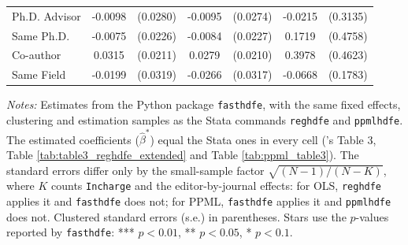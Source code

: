 \begin{table}[!htbp]
\begin{tabular*}{\linewidth}{@{\extracolsep{\fill}}lcccccc}
\quad Ph.D. Advisor & -0.0098 & (0.0280) & -0.0095 & (0.0274) & -0.0215 & (0.3135) \\
\quad Same Ph.D. & -0.0075 & (0.0226) & -0.0084 & (0.0227) & 0.1719 & (0.4758) \\
\quad Co-author & 0.0315 & (0.0211) & 0.0279 & (0.0210) & 0.3978 & (0.4623) \\
\quad Same Field & -0.0199 & (0.0319) & -0.0266 & (0.0317) & -0.0668 & (0.1783) \\
\bottomrule
\end{tabular*}
\begin{minipage}{\linewidth}
\vspace{4pt}
\footnotesize\textit{Notes:} Estimates from the Python package \texttt{fasthdfe}, with the same fixed effects, clustering and estimation samples as the Stata commands \texttt{reghdfe} and \texttt{ppmlhdfe}. The estimated coefficients ($\widehat{\beta}^\ast$) equal the Stata ones in every cell (\citeauthor{Colussi2018}'s Table 3, Table \ref{tab:table3_reghdfe_extended} and Table \ref{tab:ppml_table3}). The standard errors differ only by the small-sample factor $\sqrt{(N-1)/(N-K)}$, where $K$ counts \texttt{Incharge} and the editor-by-journal effects: for OLS, \texttt{reghdfe} applies it and \texttt{fasthdfe} does not; for PPML, \texttt{fasthdfe} applies it and \texttt{ppmlhdfe} does not. Clustered standard errors (s.e.) in parentheses. Stars use the $p$-values reported by \texttt{fasthdfe}: *** $p<0.01$, ** $p<0.05$, * $p<0.1$.
\end{minipage}
\end{table}